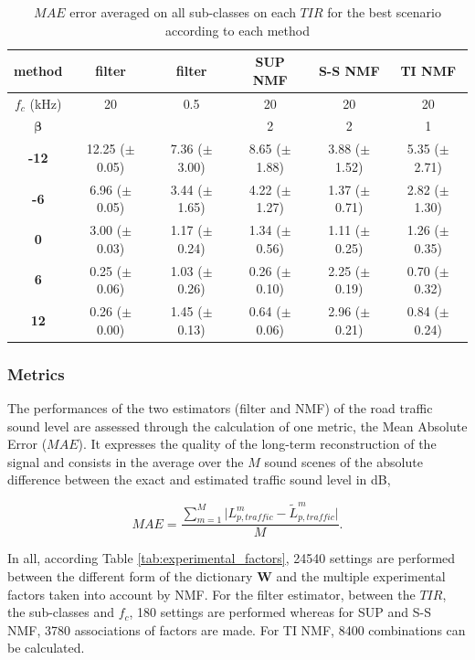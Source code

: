 \documentclass[twocolumn,a4paper,10pt]{article}
\begin{document}
\begin{table}[t]
\centering
\begin{tabular}{@{}cccccc@{}}
\toprule
\textbf{method} & filter & filter & SUP NMF & S-S NMF & TI NMF \\ \midrule
$f_c$ (kHz) & 20 & 0.5 & 20 & 20 & 20 \\
$\mathbf{\beta}$ &  &  & 2 & 2 & 1 \\ \hline
\textbf{-12} & 12.25 ($\pm$ 0.05) & 7.36 ($\pm$ 3.00) & 8.65 ($\pm$ 1.88) & 3.88 ($\pm$ 1.52) & 5.35 ($\pm$ 2.71) \\
\textbf{-6} & 6.96 ($\pm$ 0.05) & 3.44 ($\pm$ 1.65) & 4.22 ($\pm$ 1.27) & 1.37 ($\pm$ 0.71)  & 2.82 ($\pm$ 1.30) \\
\textbf{0} & 3.00 ($\pm$ 0.03) & 1.17 ($\pm$ 0.24) & 1.34 ($\pm$ 0.56) & 1.11 ($\pm$ 0.25) & 1.26 ($\pm$ 0.35) \\
\textbf{6} & 0.25 ($\pm$ 0.06) & 1.03 ($\pm$ 0.26) & 0.26 ($\pm$ 0.10) & 2.25 ($\pm$ 0.19) & 0.70 ($\pm$ 0.32) \\
\textbf{12} & 0.26 ($\pm$ 0.00) & 1.45 ($\pm$ 0.13) & 0.64 ($\pm$ 0.06) & 2.96 ($\pm$ 0.21)  & 0.84 ($\pm$ 0.24) \\ \bottomrule
\end{tabular}
\caption{$MAE$ error averaged on all sub-classes on each $TIR$ for the best scenario according to each method}
\label{tab:results_TIR}
\end{table}


\subsubsection{Metrics}
The performances of the two estimators (filter and NMF) of the road traffic sound level are assessed through the calculation of one metric, the Mean Absolute Error ($MAE$). It expresses the quality of the long-term reconstruction of the signal and consists in the average over the $M$ sound scenes of the absolute difference between the exact and estimated traffic sound level in dB,

\begin{equation}
MAE = \frac{\sum_{m = 1}^M\vert L^m_{p,traffic}-\tilde{L}^m_{p,traffic} \vert}{M}.
\end{equation}

In all, according Table \ref{tab:experimental_factors}, 24540 settings are performed between the different form of the dictionary $\mathbf{W}$ and the multiple experimental factors taken into account by NMF. For the filter estimator, between the $TIR$, the sub-classes and $f_c$, 180 settings are performed whereas for SUP and S-S NMF, 3780 associations of factors are made. For TI NMF, 8400 combinations can be calculated.
\end{document}
